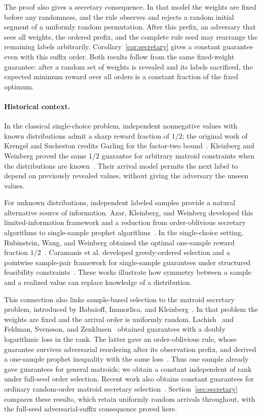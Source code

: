 The proof also gives a secretary consequence. In that model the weights
are fixed before any randomness, and the rule observes and rejects a
random initial segment of a uniformly random permutation. After this
prefix, an adversary that sees all weights, the ordered prefix, and the
complete rule seed may rearrange the remaining labels arbitrarily.
Corollary~\ref{cor:secretary} gives a constant guarantee even with this
suffix order. Both results follow from the same fixed-weight guarantee:
after a random set of weights is revealed and its labels sacrificed, the
expected minimum reward over all orders is a constant fraction of the
fixed optimum.

\paragraph{Historical context.}
In the classical single-choice
problem, independent nonnegative values with known distributions admit
a sharp reward fraction of $1/2$; the original work of Krengel and
Sucheston credits Garling for the factor-two bound~\cite{KS77}.
Kleinberg and Weinberg proved the same $1/2$ guarantee for arbitrary matroid
constraints when the distributions are known~\cite{KW12}. Their arrival
model permits the next label to depend on previously revealed values,
without giving the adversary the unseen values.

For unknown distributions, independent labeled samples provide a natural
alternative source of information. Azar, Kleinberg, and Weinberg developed
this limited-information framework and a reduction from order-oblivious
secretary algorithms to single-sample prophet algorithms~\cite{AKW14}.
In the single-choice setting, Rubinstein, Wang, and Weinberg obtained the
optimal one-sample reward fraction $1/2$~\cite{RWW20}. Caramanis et al.
developed greedy-ordered selection and a pointwise sample-pair framework
for single-sample guarantees under structured feasibility
constraints~\cite{CDF22}. These works illustrate how symmetry between a
sample and a realized value can replace knowledge of a distribution.

This connection also links sample-based selection to the matroid
secretary problem, introduced by Babaioff, Immorlica, and
Kleinberg~\cite{BIK07}. In that problem the weights are fixed and the
arrival order is uniformly random. Lachish~\cite{Lachish14} and Feldman,
Svensson, and Zenklusen~\cite{FSZ15} obtained guarantees with a doubly
logarithmic loss in the rank. The latter gave an order-oblivious rule,
whose guarantee survives adversarial reordering after its observation
prefix, and derived a one-sample prophet inequality with the same
loss~\cite[Theorem 1.1 and Corollary 1.2]{FSZ15}. Thus one sample already
gave guarantees for general matroids; we obtain a constant independent
of rank under full-seed order selection.
Recent work also obtains constant guarantees for ordinary random-order
matroid secretary selection~\cite{Singla26,Huang26}.
Section~\ref{sec:secretary} compares these results, which retain uniformly
random arrivals throughout, with the full-seed adversarial-suffix
consequence proved here.


